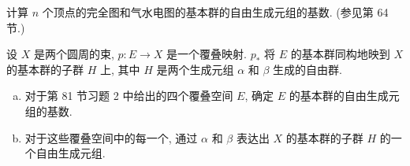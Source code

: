 \begin{exercise}
\label{exercise:ch14-sec84-02}
计算 $n$ 个顶点的完全图和气水电图的基本群的自由生成元组的基数. (参见第 64 节.)
\end{exercise}

\begin{exercise}
\label{exercise:ch14-sec84-03}
设 $X$ 是两个圆周的束, $p\colon E\to X$ 是一个覆叠映射. $p_{*}$ 将 $E$ 的基本群同构地映到 $X$ 的基本群的子群 $H$ 上, 其中 $H$ 是两个生成元组 $\alpha$ 和 $\beta$ 生成的自由群.
\begin{enumerate}[(a)]
\item 对于第 81 节习题 2 中给出的四个覆叠空间 $E$, 确定 $E$ 的基本群的自由生成元组的基数.
\item 对于这些覆叠空间中的每一个, 通过 $\alpha$ 和 $\beta$ 表达出 $X$ 的基本群的子群 $H$ 的一个自由生成元组.
\end{enumerate}
\end{exercise}

